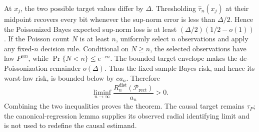 At \(x_j\), the two possible target values differ by \(\Delta\).  Thresholding \(\widehat\tau_n(x_j)\) at their midpoint recovers every bit whenever the sup-norm error is less than \(\Delta/2\).  Hence the Poissonized Bayes expected sup-norm loss is at least \((\Delta/2)(1/2-o(1))\).  If the Poisson count \(N\) is at least \(n\), uniformly select \(n\) observations and apply any fixed-\(n\) decision rule.  Conditional on \(N\geq n\), the selected observations have law \(P^{\otimes n}\), while \(\Pr\{N<n\}\leq e^{-cn}\).  The bounded target envelope makes the de-Poissonization remainder \(o(\Delta)\).  Thus the fixed-sample Bayes risk, and hence its worst-law risk, is bounded below by \(ca_n\).  Therefore
\[
 \liminf_{n\to\infty}\frac{R_n^{\mathrm{dist}}(\mathcal P_{\mathrm{rect}})}{a_n}>0.
\]
Combining the two inequalities proves the theorem.  The causal target remains \(\tau_P\); the canonical-regression lemma supplies its observed radial identifying limit and is not used to redefine the causal estimand.